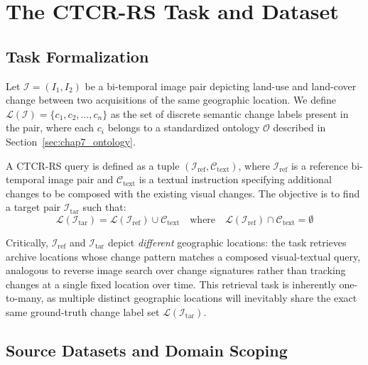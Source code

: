 \section{The CTCR-RS Task and Dataset}
\label{sec:chap7_dataset}
 
\subsection{Task Formalization}
\label{sec:chap7_task}
 
Let $\mathcal{I} = (I_1, I_2)$ be a bi-temporal image pair
depicting land-use and land-cover change between two
acquisitions of the same geographic location. We define
$\mathcal{L}(\mathcal{I}) = \{c_1, c_2, \ldots, c_n\}$ as
the set of discrete semantic change labels present in the
pair, where each $c_i$ belongs to a standardized ontology
$\mathcal{O}$ described in
Section~\ref{sec:chap7_ontology}.
 
A CTCR-RS query is defined as a tuple
$(\mathcal{I}_\text{ref}, \mathcal{C}_\text{text})$, where
$\mathcal{I}_\text{ref}$ is a reference bi-temporal image
pair and $\mathcal{C}_\text{text}$ is a textual instruction
specifying additional changes to be composed with the
existing visual changes. The objective is to find a target
pair $\mathcal{I}_\text{tar}$ such that:
\begin{equation}
    \mathcal{L}(\mathcal{I}_\text{tar}) =
    \mathcal{L}(\mathcal{I}_\text{ref}) \cup
    \mathcal{C}_\text{text}
    \quad \text{where} \quad
    \mathcal{L}(\mathcal{I}_\text{ref}) \cap
    \mathcal{C}_\text{text} = \emptyset
\end{equation}
 
Critically, $\mathcal{I}_\text{ref}$ and
$\mathcal{I}_\text{tar}$ depict \textit{different}
geographic locations: the task retrieves archive locations
whose change pattern matches a composed visual-textual query,
analogous to reverse image search over change signatures
rather than tracking changes at a single fixed location over
time. This retrieval task is inherently one-to-many, as
multiple distinct geographic locations will inevitably share
the exact same ground-truth change label set
$\mathcal{L}(\mathcal{I}_\text{tar})$.
 
\subsection{Source Datasets and Domain Scoping}
\label{sec:chap7_sources}
 
